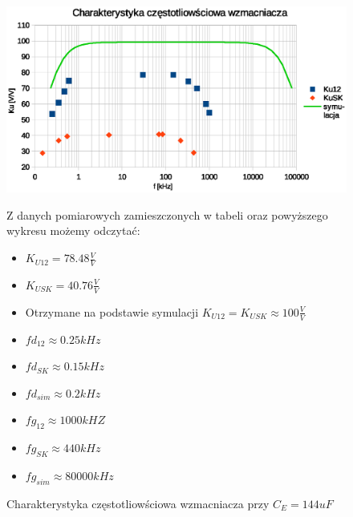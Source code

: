\documentclass[a4paper,12pt]{article}
\begin{document}
\begin{figure}[h!]
  \begin{center}
  \includegraphics[width=1\textwidth]{g1.eps}
  \caption{Charakterystyka częstotliowściowa wzmacniacza przy $C_E = 144uF$}
  \end{center}

  Z danych pomiarowych zamieszczonych w tabeli oraz powyższego wykresu możemy odczytać:
  \begin{itemize}
  \item $K_{U12} = 78.48 \frac{V}{V}$
  \item $K_{USK} = 40.76 \frac{V}{V}$
  \item Otrzymane na podstawie symulacji $K_{U12}=K_{USK}\approx 100\frac{V}{V}$
  \item $fd_{12} \approx 0.25kHz$
  \item $fd_{SK} \approx 0.15kHz$
  \item $fd_{sim} \approx 0.2kHz$
  \item $fg_{12} \approx 1000kHZ$
  \item $fg_{SK} \approx 440kHz$
  \item $fg_{sim} \approx 80000kHz$


  \end{itemize}

\end{figure}
\end{document}
